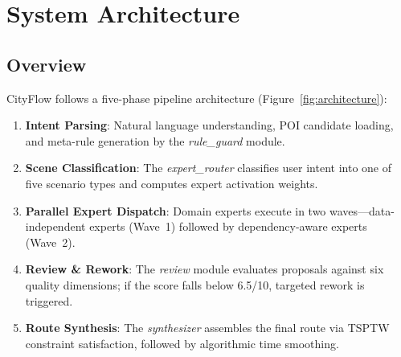 \documentclass[11pt]{article}
\begin{document}
\section{System Architecture}

\subsection{Overview}

CityFlow follows a five-phase pipeline architecture (Figure~\ref{fig:architecture}):

\begin{enumerate}[leftmargin=*]
    \item \textbf{Intent Parsing}: Natural language understanding, POI candidate loading, and meta-rule generation by the \textit{rule\_guard} module.
    \item \textbf{Scene Classification}: The \textit{expert\_router} classifies user intent into one of five scenario types and computes expert activation weights.
    \item \textbf{Parallel Expert Dispatch}: Domain experts execute in two waves---data-independent experts (Wave~1) followed by dependency-aware experts (Wave~2).
    \item \textbf{Review \& Rework}: The \textit{review} module evaluates proposals against six quality dimensions; if the score falls below 6.5/10, targeted rework is triggered.
    \item \textbf{Route Synthesis}: The \textit{synthesizer} assembles the final route via TSPTW constraint satisfaction, followed by algorithmic time smoothing.
\end{enumerate}
\end{document}
